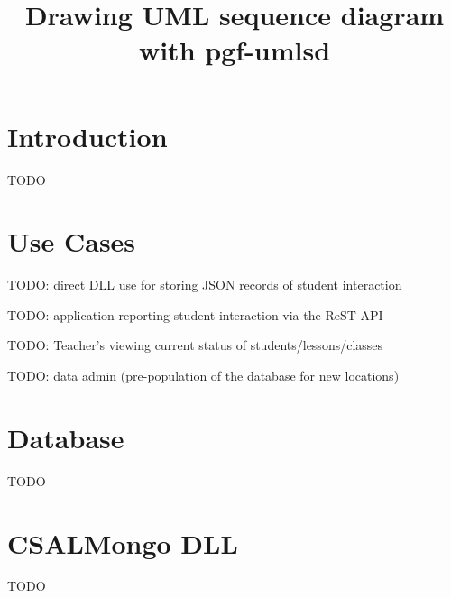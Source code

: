 \documentclass[letterpaper,10pt]{article}
\title{Drawing UML sequence diagram with pgf-umlsd}
\begin{document}
\setlength{\pdfpageheight}{\paperheight}
\setlength{\pdfpagewidth}{\paperwidth}

\setlength{\parindent}{0pt}
\setlength{\parskip}{6pt}

\maketitle
\tableofcontents
\pagebreak


\section{Introduction}

TODO


\section{Use Cases}

TODO: direct DLL use for storing JSON records of student interaction

TODO: application reporting student interaction via the ReST API

TODO: Teacher's viewing current status of students/lessons/classes

TODO: data admin (pre-population of the database for new locations)


\section{Database}

TODO


\section{CSALMongo DLL}

TODO

\end{document}
